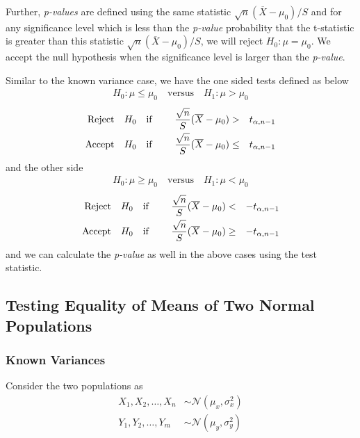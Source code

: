 \documentclass[../probability-notes.tex]{subfiles}
\begin{document}
    Further, \emph{p-values} are defined using the same statistic $\sqrt{n}(\overline{X} - \mu_{0})/S$ and for any significance level which is less than the \emph{p-value} probability that the t-statistic is greater than this statistic $\sqrt{n}(\overline{X} - \mu_{0})/S$, we will reject $H_{0}: \mu = \mu_{0}$. We accept the null hypothesis when the significance level is larger than the \emph{p-value}.\newline

    Similar to the known variance case, we have the one sided tests defined as below
    \begin{align*}
        H_{0}: \mu \leq \mu_{0} \quad \text{versus} \quad H_{1}: \mu > \mu_{0}
    \end{align*}
    \begin{alignat*}{4}
        \text{Reject\quad} &H_{0} \text{\quad if \quad} &\frac{\sqrt{n}}{S}(\overline{X} - \mu_{0}) &> &t_{\alpha, n-1}\\
        \text{Accept\quad} &H_{0} \text{\quad if\quad} &\frac{\sqrt{n}}{S}(\overline{X} - \mu_{0}) &\leq &t_{\alpha, n-1}\\
    \end{alignat*}
    and the other side
    \begin{align*}
        H_{0}: \mu \geq \mu_{0} \quad \text{versus} \quad H_{1}: \mu < \mu_{0}
    \end{align*}
    \begin{alignat*}{4}
        \text{Reject\quad} &H_{0} \text{\quad if \quad} &\frac{\sqrt{n}}{S}(\overline{X} - \mu_{0}) &< &-t_{\alpha, n-1}\\
        \text{Accept\quad} &H_{0} \text{\quad if\quad} &\frac{\sqrt{n}}{S}(\overline{X} - \mu_{0}) &\geq &-t_{\alpha, n-1}\\
    \end{alignat*}
    and we can calculate the \emph{p-value} as well in the above cases using the test statistic.\newline

    
    \subsection{Testing Equality of Means of Two Normal Populations}
    \subsubsection{Known Variances} \label{mean_diff_normal_known_variance}
    Consider the two populations as
    \begin{align*}
        X_{1}, X_{2}, \ldots, X_{n} &\sim \mathcal{N}(\mu_{x}, \sigma_{x}^{2})\\
        Y_{1}, Y_{2}, \ldots, Y_{m} &\sim \mathcal{N}(\mu_{y}, \sigma_{y}^{2})
    \end{align*}
\end{document}
